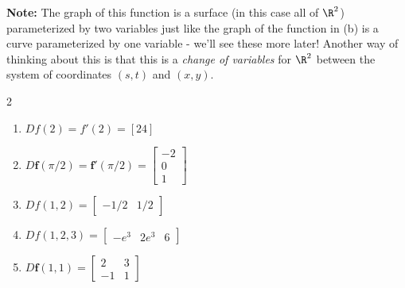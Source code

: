 \begin{enumerate}
{\begin{enumerate}
		\textbf{Note:} The graph of this function is a surface (in this case all of $\R^2$) parameterized by two variables just like the graph of the function in (b) is a curve parameterized by one variable - we'll see these more later!  Another way of thinking about this is that this is a \textit{change of variables} for $\R^2$ between the system of coordinates $(s,t)$ and $(x,y)$.
	\end{enumerate}
	}
	{ %
	\begin{multicols}{2}
		\begin{enumerate}
		\item $Df(2)=f'(2)=[24]$
		\item $D\mathbf{f}(\pi/2)=\mathbf{f}'(\pi/2)=\begin{bmatrix}
			-2 \\ 0 \\ 1
		\end{bmatrix}$
		\item $Df(1,2)=\begin{bmatrix}
			-1/2 & 1/2
		\end{bmatrix}$
		\item $Df(1,2,3)=\begin{bmatrix}
			-e^3 & 2e^3 & 6
		\end{bmatrix}$
		\item $D\mathbf{f}(1,1) = \begin{bmatrix}
			2 & 3 \\
			-1 &  1
		\end{bmatrix}  $
	\end{enumerate}
	\end{multicols}
	}
	{ %

	}
    
\end{enumerate}
